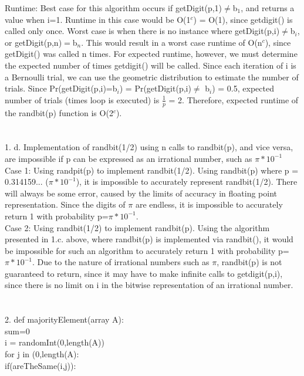 \documentclass[11pt, oneside]{article}   	%
\begin{document}
\indent Runtime:  Best case for this algorithm occurs if getDigit(p,1)$\neq$b$_1$, and returns a value when i=1.  Runtime in this case would be O(1$^c$) = O(1), since getdigit() is called only once.  Worst case is when there is no instance where getDigit(p,i)$\neq$b$_i$, or getDigit(p,n)$ = $b$_n$.  This would result in a worst case runtime of O(n$^c$), since getDigit() was called n times.  For expected runtime, however, we must determine the expected number of times getdigit() will be called.  Since each iteration of i is a Bernoulli trial, we can use the geometric distribution to estimate the number of trials.  Since Pr(getDigit(p,i)=b$_i$) = Pr(getDigit(p,i)$\neq$ b$_i$) = 0.5, expected number of trials (times loop is executed) is $\frac{1}{p}$ = 2.  Therefore, expected runtime of the randbit(p) function is O(2$^c$). \\\\\\
1. d.  Implementation of randbit(1/2) using n calls to randbit(p), and vice versa, are impossible if p can be expressed as an irrational number, such as $\pi*10^{-1}$\\
\indent Case 1:  Using randpit(p) to implement randbit(1/2).  Using randbit(p) where p = 0.314159... ($\pi * 10^{-1}$), it is impossible to accurately represent randbit(1/2).  There will always be some error, caused by the limits of accuracy in floating point representation.  Since the digits of $\pi$ are endless, it is impossible to accurately return 1 with probability p=$\pi * 10^{-1}$.\\
\indent Case 2: Using randbit(1/2) to implement randbit(p).  Using the algorithm presented in 1.c. above, where randbit(p) is implemented via randbit(), it would be impossible for such an algorithm to accurately return 1 with probability p=$\pi *10^{-1}$.  Due to the nature of irrational numbers such as $\pi$, randbit(p) is not guaranteed to return, since it may have to make infinite calls to getdigit(p,i), since there is no limit on i in the bitwise representation of an irrational number.\\\\\\
2.  def majorityElement(array A):\\
\indent\indent sum=0\\
\indent\indent i = randomInt(0,length(A))\\
\indent\indent for j in (0,length(A):\\
\indent\indent\indent if(areTheSame(i,j)):\\
\end{document}

